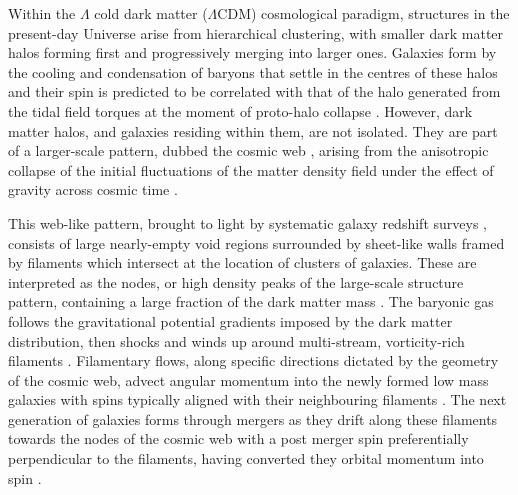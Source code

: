\documentclass[useAMS,usenatbib]{mnras}
\begin{document}
Within the $\Lambda$ cold dark matter ($\Lambda$CDM) cosmological paradigm, structures in the present-day Universe arise from hierarchical clustering, with smaller dark matter halos forming first and progressively merging into larger ones. Galaxies form by the cooling and condensation of baryons that settle in the centres of these halos \citep{WhiteRees1978}
and their spin is predicted to be correlated with that of the halo generated from the tidal field torques at the moment of proto-halo collapse \citep[tidal torque theory, TTT; e.g.][]{Peebles1969,Doroshkevich1970,EfstathiouJones1979,White1984}.
However, dark matter halos, and galaxies residing within them, are not isolated. They are part of a  larger-scale pattern,  dubbed the cosmic web \citep[][]{Joeveer1978,Bond1996}, arising  
from the anisotropic collapse of the initial fluctuations of the matter density field under the effect of gravity across cosmic time \citep{Zeldovich1970}. 
 
This web-like pattern, 
brought to light by systematic galaxy redshift surveys \citep[e.g.][]{deLapparent1986,geller1989,colless2001,Tegmark2004}, consists of large nearly-empty void regions surrounded by sheet-like walls framed by filaments which intersect at the location of clusters of galaxies. These are interpreted as the nodes, or high density peaks of the large-scale structure pattern, containing a large fraction of the dark matter mass \citep{BondMyers1996,Pogosyan1996}. The baryonic gas follows the gravitational potential gradients imposed by the dark matter distribution, then shocks and winds up around multi-stream, vorticity-rich filaments \citep{Codis2012,Laigle2015,Hahn2015}.
%
Filamentary flows, along specific directions dictated by the geometry of the cosmic web,  advect angular momentum into the newly formed low mass galaxies with  spins typically aligned with their neighbouring filaments \citep{Pichon2011,2013ApJ...769...74S}.
%
The next generation of  galaxies forms through mergers  as they drift  along these filaments towards the nodes of the cosmic web with a post merger spin preferentially perpendicular to the filaments, having converted they orbital momentum into spin \citep[e.g.][]{Aubert2004,Navarro2004,AragonCalvo2007a,Codis2012,Libeskind2012,Trowland2013,AragonCalvo2014,Dubois2014,Welker2015}.
\end{document}
